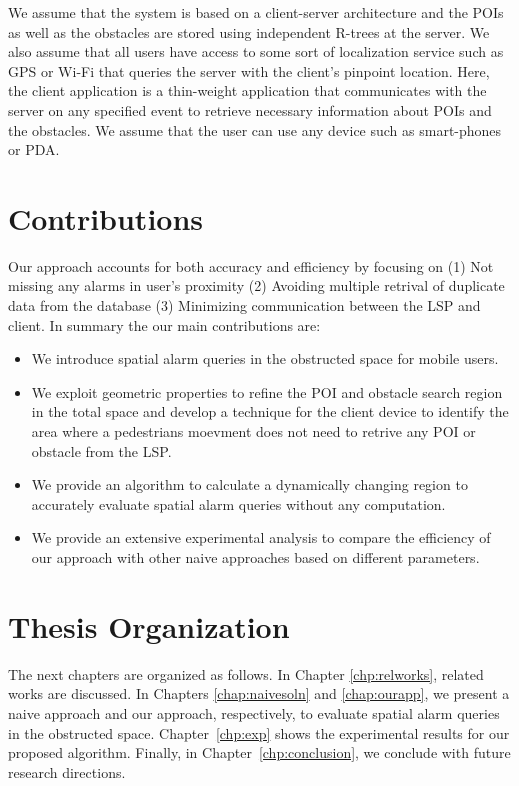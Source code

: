 We assume that the system is based on a client-server architecture and the POIs as well as the obstacles are stored using independent R-trees at the server. We also assume that all users have access to some sort of localization service such as GPS or Wi-Fi that queries the server with the client's pinpoint location. Here, the client application is a thin-weight application that communicates with the server on any specified event to retrieve necessary information about POIs and the obstacles. We assume that the user can use any device such as smart-phones or PDA.

\section{Contributions}

 Our approach accounts for both accuracy and efficiency by focusing on (1) Not missing any alarms in user's proximity (2) Avoiding multiple retrival of duplicate data from the database (3) Minimizing communication between the LSP and client. In summary the our main contributions are: 
\begin{itemize}
\setlength\itemsep{0em}
\item We introduce spatial alarm queries in the obstructed space for mobile users.
\item We exploit geometric properties to refine the POI and obstacle search region in the total space and develop a technique for the client device to identify the area where a pedestrians moevment does not need to retrive any POI or obstacle from the LSP.
\item We provide an algorithm to calculate a dynamically changing region to accurately evaluate spatial alarm queries without any computation.
\item We provide an extensive experimental analysis to compare the efficiency of our approach with other naive approaches based on different parameters.
\end{itemize}

\vspace*{10pt}


\section{Thesis Organization}
\label{sec:org}

\vspace*{5pt}

The next chapters are organized as follows. In Chapter \ref{chp:relworks}, related works are discussed. In Chapters \ref{chap:naivesoln} and \ref{chap:ourapp}, we present a naive approach and our approach, respectively, to evaluate spatial alarm queries in the obstructed space. Chapter~\ref{chp:exp} shows the experimental results for our proposed algorithm. Finally, in Chapter~\ref{chp:conclusion}, we conclude with future research directions.


